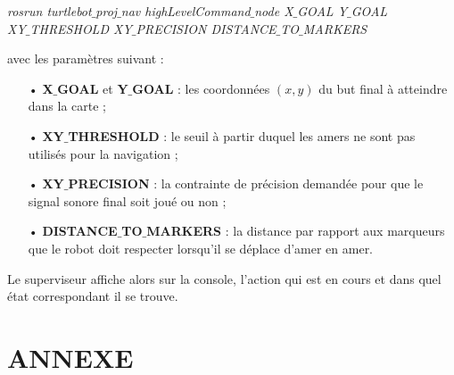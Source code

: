 \documentclass[10pt,a4paper]{article}
\begin{document}
\indent \indent \indent \textit{rosrun turtlebot$\_$proj$\_$nav highLevelCommand$\_$node X$\_$GOAL Y$\_$GOAL \\ \indent \indent \indent \indent  XY$\_$THRESHOLD XY$\_$PRECISION DISTANCE$\_$TO$\_$MARKERS}

\noindent avec les paramètres suivant : 
\begin{itemize}
\item[•] \textbf{X$\_$GOAL} et \textbf{Y$\_$GOAL} : les coordonnées $(x,y)$ du but final à atteindre dans la carte ; 
\item[•] \textbf{XY$\_$THRESHOLD} : le seuil à partir duquel les amers ne sont pas utilisés pour la navigation ; 
\item[•] \textbf{XY$\_$PRECISION} : la contrainte de précision demandée pour que le signal sonore final soit joué ou non ; 
\item[•] \textbf{DISTANCE$\_$TO$\_$MARKERS} : la distance par rapport aux marqueurs que le robot doit respecter lorsqu'il se déplace d'amer en amer.
\end{itemize}

Le superviseur affiche alors sur la console, l'action qui est en cours et dans quel état correspondant il se trouve.



\newpage
\listoffigures
\newpage

\section*{ANNEXE}
\end{document}
